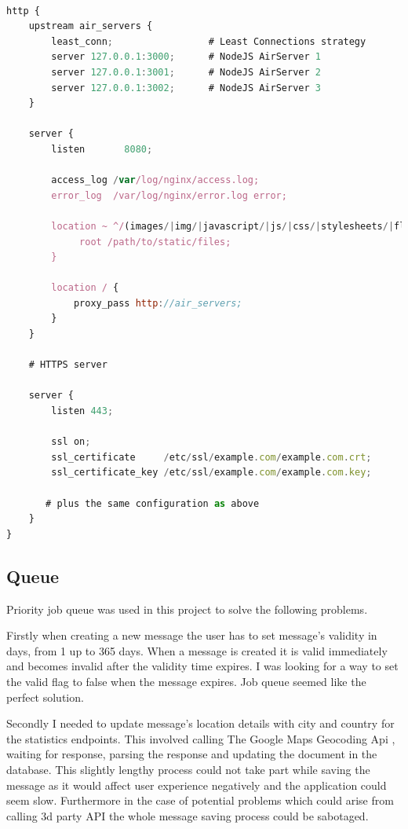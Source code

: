 \documentclass[thesis=M,english]{FITthesis}[2012/10/20]
\begin{document}
\begin{listing}
\begin{lstlisting}[language=JavaScript]

http {
    upstream air_servers {
        least_conn;                 # Least Connections strategy
        server 127.0.0.1:3000;      # NodeJS AirServer 1
        server 127.0.0.1:3001;      # NodeJS AirServer 2
        server 127.0.0.1:3002;      # NodeJS AirServer 3
    }

    server {
        listen       8080;
        
        access_log /var/log/nginx/access.log;
        error_log  /var/log/nginx/error.log error;

        location ~ ^/(images/|img/|javascript/|js/|css/|stylesheets/|flash/|media/|static/|robots.txt|humans.txt|favicon.ico) {
             root /path/to/static/files;
        }        

        location / {
            proxy_pass http://air_servers;
        }
    }

    # HTTPS server
    
    server {
        listen 443;
        
        ssl on;
        ssl_certificate     /etc/ssl/example.com/example.com.crt;
        ssl_certificate_key /etc/ssl/example.com/example.com.key;

       # plus the same configuration as above
    }
}


\end{lstlisting}
\caption{Part of the Nginx configuration file - nginx.conf. Load Balancer configuration.}
\label{lst:nginx}
\end{listing}


\subsection{Queue}

Priority job queue was used in this project to solve the following problems. 

Firstly when creating a new message the user has to set message's validity in days, from 1 up to 365 days. When a message is created it is valid immediately and becomes invalid after the validity time expires. I was looking for a way to set the valid flag to false when the message expires. Job queue seemed like the perfect solution. 

Secondly I needed to update message's location details with city and country for the statistics endpoints. This involved calling The Google Maps Geocoding Api \cite{maps-api}, waiting for response, parsing the response and updating the document in the database. This slightly lengthy process could not take part while saving the message as it would affect user experience negatively and the application could seem slow. Furthermore in the case of potential problems which could arise from calling 3d party API the whole message saving process could be sabotaged.
\end{document}
